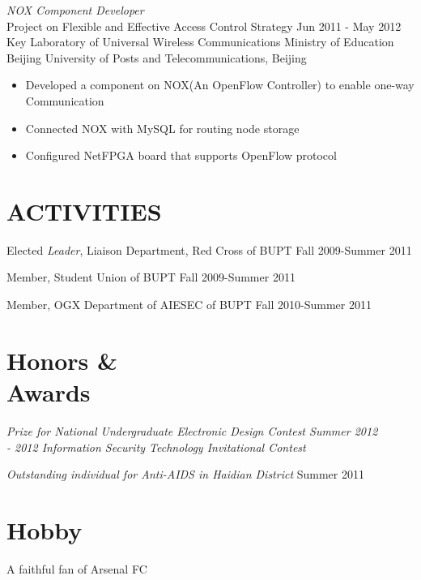\documentclass[margin]{res}
\begin{document}
\begin{resume}
    {\sl NOX Component Developer } \\
        Project on Flexible and Effective Access Control Strategy 
        \hfill Jun 2011 - May 2012 \\
        Key Laboratory of Universal Wireless Communications Ministry of Education \\
        Beijing University of Posts and Telecommunications, Beijing
        \begin{itemize}  
            \itemsep -2pt %
            \item Developed a component on NOX(An OpenFlow Controller) to enable one-way Communication
            \item Connected NOX with MySQL for routing node storage
            \item Configured NetFPGA board that supports OpenFlow protocol  
        \end{itemize}
                                                       
        
\section{ACTIVITIES}             
        Elected {\it Leader}, Liaison Department, Red Cross of BUPT 
        \hfill Fall 2009-Summer 2011
        
        Member, Student Union of BUPT
        \hfill Fall 2009-Summer 2011 
        
        Member, OGX Department of AIESEC of BUPT
        \hfill Fall 2010-Summer 2011
        
                
\section{Honors \& \\ Awards}
        {\sl Prize for National Undergraduate Electronic Design Contest \hfill Summer 2012 
        \\- 2012 Information Security Technology Invitational Contest}
        
        {\sl Outstanding individual for Anti-AIDS in Haidian District}
        \hfill Summer 2011

        
\section{Hobby} A faithful fan of Arsenal FC 

\end{resume}
\end{document}
